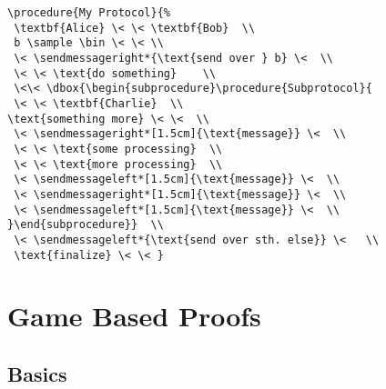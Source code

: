 \documentclass[a4paper]{report}
\begin{document}
\begin{lstlisting}
\procedure{My Protocol}{%
 \textbf{Alice} \< \< \textbf{Bob}  \\
 b \sample \bin \< \< \\
 \< \sendmessageright*{\text{send over } b} \<  \\
 \< \< \text{do something}    \\
 \<\< \dbox{\begin{subprocedure}\procedure{Subprotocol}{
 \< \< \textbf{Charlie}  \\
\text{something more} \< \<  \\
 \< \sendmessageright*[1.5cm]{\text{message}} \<  \\
 \< \< \text{some processing}  \\
 \< \< \text{more processing}  \\ 
 \< \sendmessageleft*[1.5cm]{\text{message}} \<  \\
 \< \sendmessageright*[1.5cm]{\text{message}} \<  \\
 \< \sendmessageleft*[1.5cm]{\text{message}} \<  \\
}\end{subprocedure}}  \\
 \< \sendmessageleft*{\text{send over sth. else}} \<   \\
 \text{finalize} \< \< }
\end{lstlisting}






\chapter{Game Based Proofs}
\label{chap:gbproofs}

\section{Basics}
\end{document}

